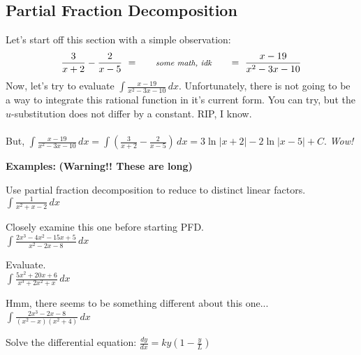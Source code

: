 \subsection*{Partial Fraction Decomposition}



Let's start off this section with a simple observation:
    \[\displaystyle\frac{3}{x+2}-\frac{2}{x-5}\,\, = \,\, \hspace{.2in}\textit{\footnotesize     some math, idk}\hspace{.2in} \,\,=\,\, \frac{x-19}{x^2-3x-10}\]
Now, let's try to evaluate $\displaystyle\int\frac{x-19}{x^2-3x-10}\,dx$. Unfortunately, there is not going to be a way to integrate this rational function in it's current form. You can try, but the $u$-substitution does not differ by a constant. RIP, I know. \\
\\
But, $\displaystyle\int\frac{x-19}{x^2-3x-10}\,dx=\int\left(\frac{3}{x+2}-\frac{2}{x-5}\right)\,dx=3\ln|x+2|-2\ln|x-5|+C$. \textit{\footnotesize Wow!}

\vspace{.25in}

\textbf{Examples:} \textbf{(Warning!! These are long)}
\begin{questions}
    \question Use partial fraction decomposition to reduce to distinct linear factors.\\
    $\displaystyle\int\frac{1}{x^2+x-2}\,dx$
    
    \newpage
    
    \question Closely examine this one before starting PFD.\\
    $\displaystyle\int\frac{2x^3-4x^2-15x+5}{x^2-2x-8}\,dx$
    
    \newpage
    
    \question Evaluate.\\
    $\displaystyle\int\frac{5x^2+20x+6}{x^3+2x^2+x}\,dx$
    
    \newpage
    
    \question Hmm, there seems to be something different about this one...\\
    $\displaystyle\int\frac{2x^3-2x-8}{(x^2-x)(x^2+4)}\,dx$
    
    
    \question Solve the differential equation: $\displaystyle\frac{dy}{dx}=ky\left(1-\frac{y}{L}\right)$
    
\end{questions}



\newpage
